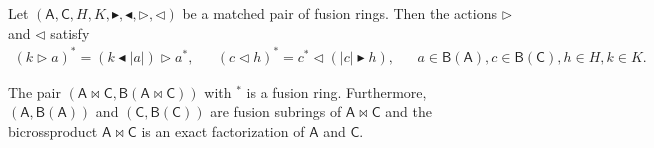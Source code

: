 \documentclass[10pt,a4paper]{amsart}
\newcommand{\degf}[1]{\left|#1\right|}
\newcommand{\fiz}{\triangleleft}
\newcommand{\fizb}{\blacktriangleleft}
\newcommand{\trid}{\triangleright}
\newcommand{\tridb}{\blacktriangleright}
\begin{document}
\begin{lemma}\label{lemma:dual-of-triangles}
Let $(\mathsf A, \mathsf C, H, K, \tridb, \fizb, \trid, \fiz)$ be a matched pair of fusion rings. Then the actions $\trid$ and $\fiz$ satisfy
\begin{align*}
    (k\trid a)^* = (k\fizb \degf{a})\trid a^*, && (c\fiz h)^* = c^*\fiz (\degf{c}\tridb h), && a\in \mathsf{B}(\mathsf{A}), c\in\mathsf{B}(\mathsf{C}), h\in H, k\in K.
\end{align*}
\end{lemma}

\begin{theorem}\label{thm:bicrossed-product-fusion-rings}     The pair $(\mathsf{A}\bowtie \mathsf{C}, \mathsf{B}(\mathsf{A}\bowtie \mathsf{C}))$ with $^*$ is a fusion ring. Furthermore, $(\mathsf{A},\mathsf{B}(\mathsf{A}))$ and $(\mathsf{C},\mathsf{B}(\mathsf{C}))$  are fusion subrings of $\mathsf{A}\bowtie \mathsf{C}$ and the bicrossproduct $\mathsf{A}\bowtie \mathsf{C}$ is an exact factorization of $\mathsf{A}$ and $\mathsf{C}$.
\end{theorem}
\end{document}
